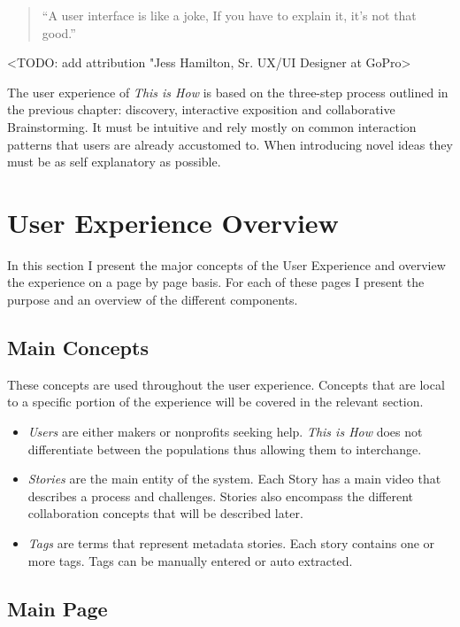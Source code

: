 \begin{quotation}
``A user interface is like a joke, If you have to explain it, it's not that good.''
\end{quotation}

<TODO: add attribution "Jess Hamilton, Sr. UX/UI Designer at GoPro>

The user experience of \textit{This is How} is based on the three-step process outlined in the previous chapter: discovery, interactive exposition and collaborative Brainstorming. It must be intuitive and rely mostly on common interaction patterns that users are already accustomed to. When introducing novel ideas they must be as self explanatory as possible. 

\section{User Experience Overview}

In this section I present the major concepts of the User Experience and overview the experience on a page by page basis. For each of these pages I present the purpose and an overview of the different components. 

\subsection{Main Concepts}

These concepts are used throughout the user experience. Concepts that are local to a specific portion of the experience will be covered in the relevant section.

\begin{itemize}
\item \textit{Users} are either makers or nonprofits seeking help. \textit{This is How} does not differentiate between the populations thus allowing them to interchange.

\item \textit{Stories} are the main entity of the system. Each Story has a main video that describes a process and challenges. Stories also encompass the different collaboration concepts that will be described later.

\item \textit{Tags} are terms that represent metadata stories. Each story contains one or more tags. Tags can be manually entered or auto extracted. 
\end{itemize}


\subsection{Main Page}

